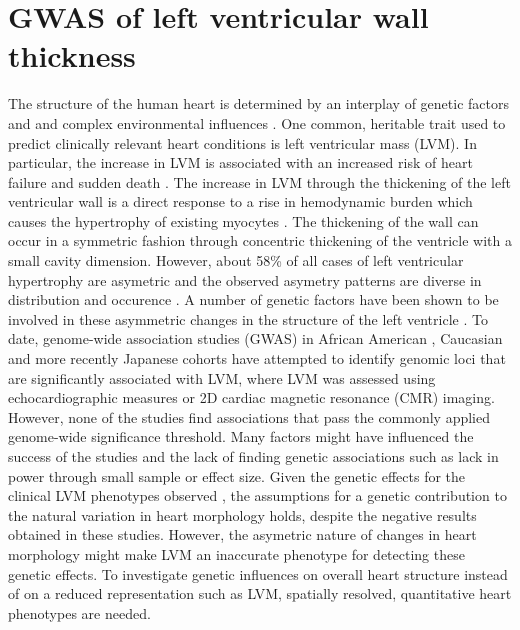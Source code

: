 \chapter{GWAS of left ventricular wall thickness}
\label{chapter:gwas-3Dheart}
The structure of the human heart is determined by an interplay of genetic factors and and complex environmental influences \citep{Payne1995, Sanoudou2005, O'Toole2008}. One common, heritable trait used to predict clinically relevant heart conditions is left ventricular mass (LVM). In particular, the increase in LVM is associated with an increased risk of heart failure and sudden death \citep{Haider1998,Post1997,Lorell2000}.  The increase in LVM through the thickening of the left ventricular wall is a direct response to a rise in hemodynamic burden which causes the hypertrophy of existing myocytes \citep{Lorrel2000}. The thickening of the wall can occur in a symmetric fashion through concentric thickening of the ventricle with a small cavity dimension. However, about \num{58}\%  of all cases of left ventricular hypertrophy are asymetric \citep{Davies1995} and the observed asymetry patterns are diverse in distribution and occurence \citep{Hughes2004,Florian2012}. A number of genetic factors have been shown to be involved in these asymmetric changes in the structure of the left ventricle \citep{Davies1995,Chen1999,VanderMerwe2008}. To date, genome-wide association studies (GWAS) in African American \citep{Fox2013}, Caucasian \citep{Vasan2007, Vasan2009, Arnett2009} and more recently Japanese cohorts \citep{Sano2016} have attempted to identify genomic loci that are significantly associated with LVM, where LVM was assessed using echocardiographic measures or 2D cardiac magnetic resonance (CMR) imaging. However, none of the studies find associations that pass the commonly applied genome-wide significance threshold. Many factors might have influenced the success of the studies and the lack of finding genetic associations such as lack in power through small sample or effect size. Given the genetic effects for the clinical LVM phenotypes observed \citep{Davies1995,Chen1999,VanderMerwe2008}, the assumptions for a genetic contribution to the natural variation in heart morphology holds, despite the negative results obtained in these studies. However, the asymetric nature of changes in heart morphology might make LVM an inaccurate phenotype for detecting these genetic effects. To investigate genetic influences on overall heart structure instead of on a reduced representation such as LVM, spatially resolved, quantitative heart phenotypes are needed. 

